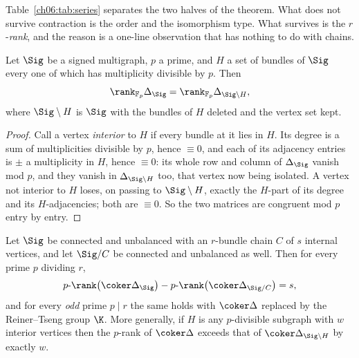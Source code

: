 Table~\ref{ch06:tab:series} separates the two halves of the theorem. What does not survive
contraction is the order and the isomorphism type. What survives is the $r$-\emph{rank}, and
the reason is a one-line observation that has nothing to do with chains.

\begin{lemma}\label{ch06:lem:pdiv}
Let $\Sig$ be a signed multigraph, $p$ a prime, and $H$ a set of bundles of $\Sig$ every one
of which has multiplicity divisible by $p$. Then
\[
  \rank_{\mathbb F_p}\Delta_\Sig=\rank_{\mathbb F_p}\Delta_{\Sig\setminus H},
\]
where $\Sig\setminus H$ is $\Sig$ with the bundles of $H$ deleted and the vertex set kept.
\end{lemma}

\begin{proof}
Call a vertex \emph{interior} to $H$ if every bundle at it lies in $H$. Its degree is a sum
of multiplicities divisible by $p$, hence $\equiv0$, and each of its adjacency entries is
$\pm$ a multiplicity in $H$, hence $\equiv0$: its whole row and column of $\Delta_\Sig$
vanish mod $p$, and they vanish in $\Delta_{\Sig\setminus H}$ too, that vertex now being
isolated. A vertex not interior to $H$ loses, on passing to $\Sig\setminus H$, exactly the
$H$-part of its degree and its $H$-adjacencies; both are $\equiv0$. So the two matrices are
congruent mod $p$ entry by entry.
\end{proof}

\begin{theorem}\label{ch06:thm:prank}
Let $\Sig$ be connected and unbalanced with an $r$-bundle chain $C$ of $s$ internal vertices,
and let $\Sig/C$ be connected and unbalanced as well. Then for every prime $p$ dividing $r$,
\[
  p\text{-}\rank\bigl(\coker\Delta_\Sig\bigr)-p\text{-}\rank\bigl(\coker\Delta_{\Sig/C}\bigr)=s ,
\]
and for every \emph{odd} prime $p\mid r$ the same holds with $\coker\Delta$ replaced by the
Reiner--Tseng group $\K$. More generally, if $H$ is any $p$-divisible subgraph with $w$
interior vertices then the $p$-rank of $\coker\Delta$ exceeds that of
$\coker\Delta_{\Sig\setminus H}$ by exactly $w$.
\end{theorem}


